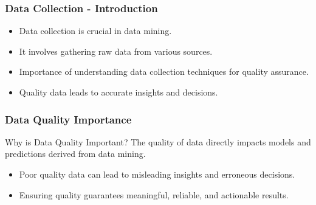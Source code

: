 \documentclass[aspectratio=169]{beamer}
\begin{document}
\begin{frame}[fragile]
    \frametitle{Data Collection - Introduction}
    \begin{itemize}
        \item Data collection is crucial in data mining.
        \item It involves gathering raw data from various sources.
        \item Importance of understanding data collection techniques for quality assurance.
        \item Quality data leads to accurate insights and decisions.
    \end{itemize}
\end{frame}

\begin{frame}[fragile]
    \frametitle{Data Quality Importance}
    \begin{block}{Why is Data Quality Important?}
        The quality of data directly impacts models and predictions derived from data mining.
    \end{block}
    \begin{itemize}
        \item Poor quality data can lead to misleading insights and erroneous decisions.
        \item Ensuring quality guarantees meaningful, reliable, and actionable results.
    \end{itemize}
\end{frame}
\end{document}

